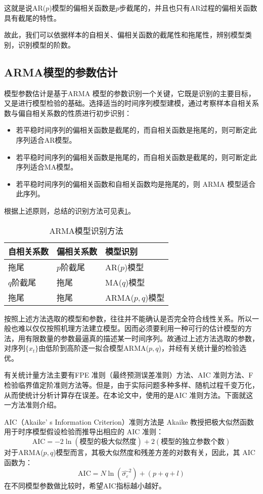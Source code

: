 这就是说AR($p$)模型的偏相关函数是$p$步截尾的，并且也只有AR过程的偏相关函数具有截尾的特性。

故此，我们可以依据样本的自相关、偏相关函数的截尾性和拖尾性，辨别模型类别，识别模型的阶数。

\subsection{ARMA模型的参数估计}
模型参数估计是基于ARMA 模型的参数识别一个关键，它既是识别的主要目标，又是进行模型检验的基础。选择适当的时间序列模型建模，通过考察样本自相关系数与偏自相关系数的性质进行初步识别：
\begin{itemize}
	\item 若平稳时间序列的偏相关函数是截尾的，而自相关函数是拖尾的，则可断定此序列适合AR模型。
	\item 若平稳时间序列的偏相关函数是拖尾的，而自相关函数是截尾的，则可断定此序列适合MA模型。
	\item 若平稳时间序列的偏相关函数和自相关函数均是拖尾的，则 ARMA 模型适合此序列。
\end{itemize}
根据上述原则，总结的识别方法可见表\ref{tab:ARMAshibie}。
\begin{table}[htbp] 
	\centering
	\caption{\label{tab:ARMAshibie}ARMA模型识别方法} 
	\begin{tabular}{lll} 
		\toprule 
		自相关系数 & 偏相关系数 & 模型识别\\ 
		\midrule
		拖尾 & $p$阶截尾 & AR($p$)模型 \\
		$q$阶截尾 & 拖尾 & MA($q$)模型\\ 
		拖尾 & 拖尾 & ARMA($p,q$)模型\\
		\bottomrule 
	\end{tabular} 
\end{table}

按照上述方法选取的模型和参数，往往并不能确认是否完全符合线性关系。所以一般也难以仅仅按照机理方法建立模型。因而必须要利用一种可行的估计模型的方法，用有限数量的参数最逼真的描述某一时间序列。故通过上述方法选取的参数，对序列$\{ x_t\}$由低阶到高阶逐一拟合模型ARMA($p,q$)，并经有关统计量的检验选优。

有关统计量方法主要有FPE 准则（最终预测误差准则）方法、AIC 准则方法、F 检验临界值定阶准则方法等。但是，由于实际问题多种多样、随机过程千变万化，从而使统计分析计算存在误差。在本论文中，使用的是AIC 准则方法。下面就这一方法准则介绍。

AIC（Akaike’ s Information Criterion）准则方法是 Akaike 教授把极大似然函数用于时序模型假设检验而推导出相应的 AIC 准则：
$$	\mathrm{AIC} = -2\ln(\text{模型的极大似然度} )+2(\text{模型的独立参数个数}) $$
对于ARMA($p,q$)模型而言，其极大似然度和残差方差的对数有关，因此，其 AIC 函数为：
\begin{equation}
	\mathrm{AIC} = N\ln({\hat{\sigma_\varepsilon}}^2)+(p+q+l)
\end{equation}
在不同模型参数做比较时，希望AIC指标越小越好。


